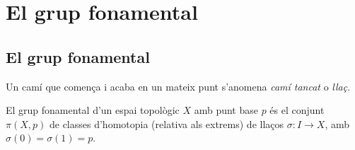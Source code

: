 \documentclass[../main.tex]{subfiles}
\begin{document}
\chapter{El grup fonamental}











\section{El grup fonamental}
\begin{defi}
\label{def:camitancat}\label{def:llaç} Un camí que comença i acaba en un mateix punt s'anomena \textit{camí tancat} o \textit{llaç}. 
\end{defi}

\begin{defi}
\label{def:grupfonamental} El grup fonamental d'un espai topològic $X$ amb punt base $p$ és el conjunt $\pi(X,p)$ de classes d'homotopia (relativa als extrems) de llaços $\sigma:I\rightarrow X$, amb $\sigma(0) = \sigma(1)=p$.
\end{defi}
\end{document}
